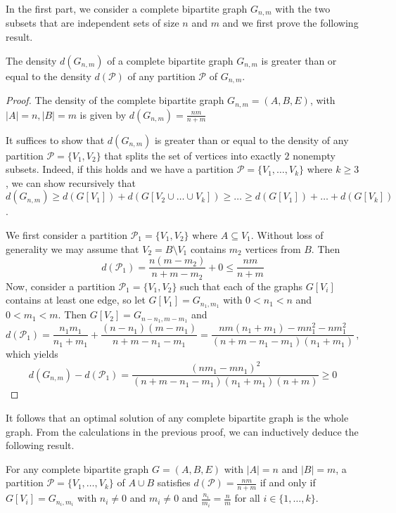 \documentclass[a4paper,USenglish,cleveref, autoref]{lipics-v2021}
\begin{document}
In the first part, we consider a  complete bipartite graph $G_{n,m}$ with the two subsets that are independent sets of size $n$ and $m$ and we first prove the following result.
 
\begin{lemma} \label{complete_bipartite_lem}
The density $d(G_{n,m})$ of a complete bipartite  graph $G_{n,m}$ is greater than or equal to the density $d(\mathcal{P})$ of any partition $\mathcal{P}$ of $G_{n,m}$.
\end{lemma}
\begin{proof}

The density of the complete bipartite  graph $G_{n,m}=(A,B,E)$, with $|A|=n, |B|=m$ is given by $d(G_{n,m}) = \frac{nm}{n+m}$
 
It suffices to show that $d(G_{n,m})$ is greater than or equal to the density of any partition $\mathcal{P} = \{ V_1, V_2\}$ that splits the set of vertices into exactly $2$ nonempty subsets. Indeed,  if this holds and  we have a partition $\mathcal{P} = \{ V_1, \dots, V_k\}$ where $k \geq 3$, we can show recursively that $d(G_{n,m}) \geq d(G[V_1])+ d(G[V_2 \cup \dots \cup V_k]) \geq \dots \geq d(G[V_1])+ \dots + d(G[V_k])$.

 
We first consider a partition $\mathcal{P}_1 = \{ V_1,  V_2\}$ where  $A\subseteq V_1$. Without loss of generality we may assume that $V_2=B\setminus V_1$ contains $m_2$  vertices from $B$. Then 
\begin{equation*}
d(\mathcal{P}_1) = \frac{n(m-m_2)}{n+m-m_2} + 0 \leq \frac{nm}{n+m}
\label{density_of_P_1}
\end{equation*}
Now, consider a partition $\mathcal{P}_1 = \{ V_1,  V_2\}$ such that each of the graphs $G[V_i]$ contains at least one edge, so let $G[V_1]=G_{n_1,m_1}$ with $0<n_1<n$ and $0<m_1<m$. Then $G[V_2]=G_{n-n_1,m-m_1}$ and
\begin{equation*}
d(\mathcal{P}_1) = \frac{n_1m_1}{n_1+m_1} + \frac{(n-n_1)(m-m_1)}{n+m-n_1-m_1} = \frac{nm(n_1+m_1)-mn_1^2-nm_1^2}{(n+m-n_1-m_1)(n_1+m_1)}\,,
\end{equation*}
which yields
\begin{equation*}
d(G_{n,m})-d(\mathcal{P}_1) =\frac{(nm_1-mn_1)^2}{(n+m-n_1-m_1)(n_1+m_1)(n+m)}\geq 0
\end{equation*}
\end{proof}

It follows that an optimal solution of  any complete bipartite graph is the whole graph. From the calculations in the previous proof, we can inductively deduce the following result.
\begin{corollary}\label{bipar_cond}
For any complete bipartite graph $G=(A,B,E)$ with $|A|=n$ and $|B|=m$, a partition $\mathcal{P}=\{V_1,\dots,V_k\}$ of $A\cup B$ satisfies $d(\mathcal{P}) = \frac{nm}{n+m}$    if and only if $G[V_i]=G_{n_i,m_i}$ with $n_i\not=0$ and $m_i\not=0$ and $\frac{n_i}{m_i}=\frac{n}{m}$ for all $i\in\{1,\dots,k\}$.
\end{corollary}
 
\end{document}
